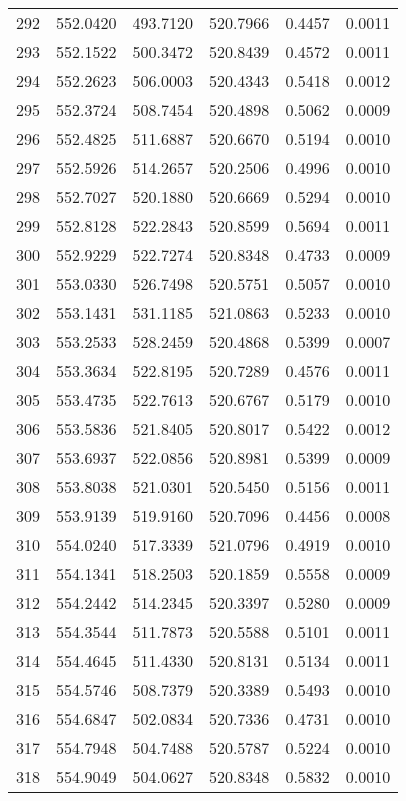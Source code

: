 \documentclass{article}
\begin{document}
\begin{longtable}{|c|c|c|c|c|c|}
292 & 552.0420 & 493.7120 & 520.7966 & 0.4457 & 0.0011 \\
293 & 552.1522 & 500.3472 & 520.8439 & 0.4572 & 0.0011 \\
294 & 552.2623 & 506.0003 & 520.4343 & 0.5418 & 0.0012 \\
295 & 552.3724 & 508.7454 & 520.4898 & 0.5062 & 0.0009 \\
296 & 552.4825 & 511.6887 & 520.6670 & 0.5194 & 0.0010 \\
297 & 552.5926 & 514.2657 & 520.2506 & 0.4996 & 0.0010 \\
298 & 552.7027 & 520.1880 & 520.6669 & 0.5294 & 0.0010 \\
299 & 552.8128 & 522.2843 & 520.8599 & 0.5694 & 0.0011 \\
300 & 552.9229 & 522.7274 & 520.8348 & 0.4733 & 0.0009 \\
301 & 553.0330 & 526.7498 & 520.5751 & 0.5057 & 0.0010 \\
302 & 553.1431 & 531.1185 & 521.0863 & 0.5233 & 0.0010 \\
303 & 553.2533 & 528.2459 & 520.4868 & 0.5399 & 0.0007 \\
304 & 553.3634 & 522.8195 & 520.7289 & 0.4576 & 0.0011 \\
305 & 553.4735 & 522.7613 & 520.6767 & 0.5179 & 0.0010 \\
306 & 553.5836 & 521.8405 & 520.8017 & 0.5422 & 0.0012 \\
307 & 553.6937 & 522.0856 & 520.8981 & 0.5399 & 0.0009 \\
308 & 553.8038 & 521.0301 & 520.5450 & 0.5156 & 0.0011 \\
309 & 553.9139 & 519.9160 & 520.7096 & 0.4456 & 0.0008 \\
310 & 554.0240 & 517.3339 & 521.0796 & 0.4919 & 0.0010 \\
311 & 554.1341 & 518.2503 & 520.1859 & 0.5558 & 0.0009 \\
312 & 554.2442 & 514.2345 & 520.3397 & 0.5280 & 0.0009 \\
313 & 554.3544 & 511.7873 & 520.5588 & 0.5101 & 0.0011 \\
314 & 554.4645 & 511.4330 & 520.8131 & 0.5134 & 0.0011 \\
315 & 554.5746 & 508.7379 & 520.3389 & 0.5493 & 0.0010 \\
316 & 554.6847 & 502.0834 & 520.7336 & 0.4731 & 0.0010 \\
317 & 554.7948 & 504.7488 & 520.5787 & 0.5224 & 0.0010 \\
318 & 554.9049 & 504.0627 & 520.8348 & 0.5832 & 0.0010 \\

\end{longtable}
\end{document}
